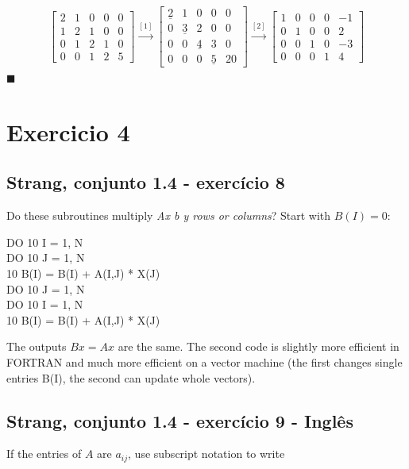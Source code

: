\documentclass[12pt,a4paper]{article}
\newcommand{\qed}{\hfill $\blacksquare$}
\begin{document}
\begin{align*}
\begin{bmatrix}
2 & 1 & 0 & 0 & 0\\
1 & 2 & 1 & 0 & 0\\
0 & 1 & 2 & 1 & 0\\
0 & 0 & 1 & 2 & 5
\end{bmatrix}
\xrightarrow{[1]}
\begin{bmatrix}
\underline{2} & 1 & 0 & 0 & 0\\
0 & \underline{3} & 2 & 0 & 0\\
0 & 0 & \underline{4} & 3 & 0\\
0 & 0 & 0 & \underline{5} & 20
\end{bmatrix}
\xrightarrow{[2]}
\begin{bmatrix}
1 & 0 & 0 & 0 & -1\\
0 & 1 & 0 & 0 & 2\\
0 & 0 & 1 & 0 & -3\\
0 & 0 & 0 & 1 & 4
\end{bmatrix}
\end{align*}
\qed

\newpage
\section*{Exercicio 4}
\subsection*{Strang, conjunto 1.4 - exercício 8}
Do these subroutines multiply \textit{Ax b y rows or columns}? Start with $ B(I) = 0 $:


DO 10 I = 1, N\\
DO 10 J = 1, N\\
10 B(I) = B(I) + A(I,J) * X(J)
\\

DO 10 J = 1, N\\
DO 10 I = 1, N\\
10 B(I) = B(I) + A(I,J) * X(J)

The outputs $ Bx = Ax $ are the same. The second code is slightly more efficient in
FORTRAN and much more efficient on a vector machine (the first changes single
entries B(I), the second can update whole vectors).

\subsection*{Strang, conjunto 1.4 - exercício 9 - Inglês}
 If the entries of $ A $ are $ a_{ij} $, use subscript notation to write
\end{document}
